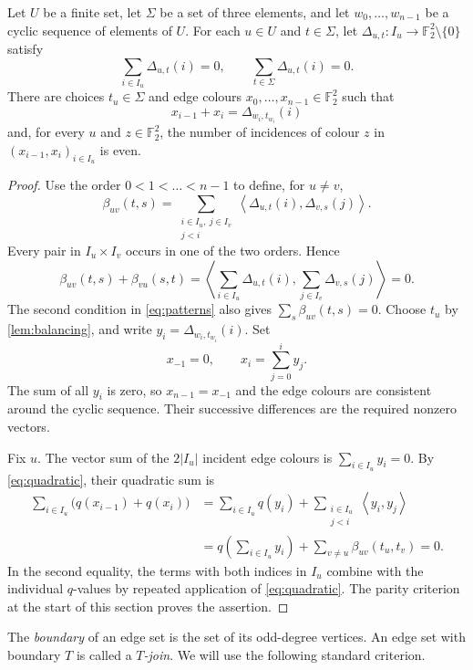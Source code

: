 \documentclass[justified,notoc,twoside,nobib,nofonts]{tufte-handout}
\newcommand{\K}{\mathbb F_2^2}
\newcommand{\pair}[2]{\left\langle #1,#2\right\rangle}
\begin{document}
\begin{lemma}\label{lem:word}
Let $U$ be a finite set, let $\Sigma$ be a set of three elements,
and let $w_0,\dots,w_{n-1}$ be a cyclic sequence of elements of $U$.
For each $u\in U$ and $t\in\Sigma$,
let $\Delta_{u,t}:I_u\to\K\setminus\{0\}$
satisfy
\begin{equation}\label{eq:patterns}
  \sum_{i\in I_u}\Delta_{u,t}(i)=0,\qquad
  \sum_{t\in\Sigma}\Delta_{u,t}(i)=0.
\end{equation}
There are choices $t_u\in\Sigma$ and edge colours
$x_0,\dots,x_{n-1}\in\K$
such that
\[
  x_{i-1}+x_i=\Delta_{w_i,t_{w_i}}(i)
\]
and, for every $u$ and $z\in\K$, the number of incidences of colour
$z$ in $(x_{i-1},x_i)_{i\in I_u}$ is even.
\end{lemma}

\begin{proof}
Use the order $0<1<\dots<n-1$ to define, for $u\ne v$,
\[
 \beta_{uv}(t,s)=
 \sum_{\substack{i\in I_u,\ j\in I_v\\j<i}}
   \pair{\Delta_{u,t}(i)}{\Delta_{v,s}(j)}.
\]
Every pair in $I_u\times I_v$ occurs in one of the two orders. Hence
\[
 \beta_{uv}(t,s)+\beta_{vu}(s,t)
 =\pair{\sum_{i\in I_u}\Delta_{u,t}(i)}
        {\sum_{j\in I_v}\Delta_{v,s}(j)}=0.
\]
The second condition in \eqref{eq:patterns} also gives
$\sum_s\beta_{uv}(t,s)=0$. Choose $t_u$ by \cref{lem:balancing},
and write $y_i=\Delta_{w_i,t_{w_i}}(i)$. Set
\[
  x_{-1}=0,\qquad x_i=\sum_{j=0}^{i}y_j.
\]
The sum of all $y_i$ is zero, so $x_{n-1}=x_{-1}$ and the edge
colours are consistent around the cyclic sequence. Their successive
differences are the required nonzero vectors.

Fix $u$. The vector sum of the $2|I_u|$ incident edge colours is
$\sum_{i\in I_u}y_i=0$. By \eqref{eq:quadratic}, their quadratic sum is
\begin{align*}
 \sum_{i\in I_u}\bigl(q(x_{i-1})+q(x_i)\bigr)
 &=\sum_{i\in I_u}q(y_i)
   +\sum_{\substack{i\in I_u\\j<i}}\pair{y_i}{y_j}\\
 &=q\left(\sum_{i\in I_u}y_i\right)
   +\sum_{v\ne u}\beta_{uv}(t_u,t_v)=0.
\end{align*}
In the second equality, the terms with both indices in $I_u$ combine
with the individual $q$-values by repeated application of
\eqref{eq:quadratic}. The parity criterion at the start of this
section proves the assertion.
\end{proof}

The \emph{boundary} of an edge set is the set of its odd-degree
vertices. An edge set with boundary $T$ is called a \emph{$T$-join}.
We will use the following standard criterion.
\end{document}

